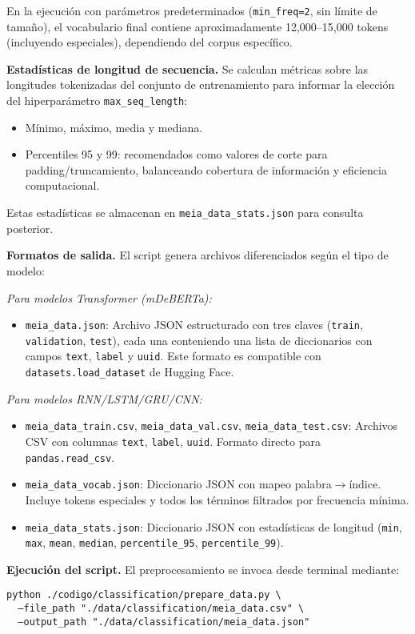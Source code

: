 \documentclass[paper=letter, fontsize=11pt, draft=false]{scrartcl}
\numberwithin{equation}{section} %
\numberwithin{figure}{section} %
\numberwithin{table}{section} %
\numberwithin{subsection}{section}
\begin{document}
En la ejecución con parámetros predeterminados (\texttt{min\_freq=2}, sin límite de tamaño), el vocabulario final contiene aproximadamente 12,000–15,000 tokens (incluyendo especiales), dependiendo del corpus específico.

\textbf{Estadísticas de longitud de secuencia.} Se calculan métricas sobre las longitudes tokenizadas del conjunto de entrenamiento para informar la elección del hiperparámetro \texttt{max\_seq\_length}:
\begin{itemize}
    \item Mínimo, máximo, media y mediana.
    \item Percentiles 95 y 99: recomendados como valores de corte para padding/truncamiento, balanceando cobertura de información y eficiencia computacional.
\end{itemize}
Estas estadísticas se almacenan en \texttt{meia\_data\_stats.json} para consulta posterior.

\textbf{Formatos de salida.} El script genera archivos diferenciados según el tipo de modelo:

\textit{Para modelos Transformer (mDeBERTa):}
\begin{itemize}
    \item \texttt{meia\_data.json}: Archivo JSON estructurado con tres claves (\texttt{train}, \texttt{validation}, \texttt{test}), cada una conteniendo una lista de diccionarios con campos \texttt{text}, \texttt{label} y \texttt{uuid}. Este formato es compatible con \texttt{datasets.load\_dataset} de Hugging Face.
\end{itemize}

\textit{Para modelos RNN/LSTM/GRU/CNN:}
\begin{itemize}
    \item \texttt{meia\_data\_train.csv}, \texttt{meia\_data\_val.csv}, \texttt{meia\_data\_test.csv}: Archivos CSV con columnas \texttt{text}, \texttt{label}, \texttt{uuid}. Formato directo para \texttt{pandas.read\_csv}.
    \item \texttt{meia\_data\_vocab.json}: Diccionario JSON con mapeo palabra$\to$índice. Incluye tokens especiales y todos los términos filtrados por frecuencia mínima.
    \item \texttt{meia\_data\_stats.json}: Diccionario JSON con estadísticas de longitud (\texttt{min}, \texttt{max}, \texttt{mean}, \texttt{median}, \texttt{percentile\_95}, \texttt{percentile\_99}).
\end{itemize}

\textbf{Ejecución del script.} El preprocesamiento se invoca desde terminal mediante:
\begin{center}
\texttt{python ./codigo/classification/prepare\_data.py \textbackslash} \\
\texttt{~~--file\_path "./data/classification/meia\_data.csv" \textbackslash} \\
\texttt{~~--output\_path "./data/classification/meia\_data.json"}
\end{center}
\end{document}
